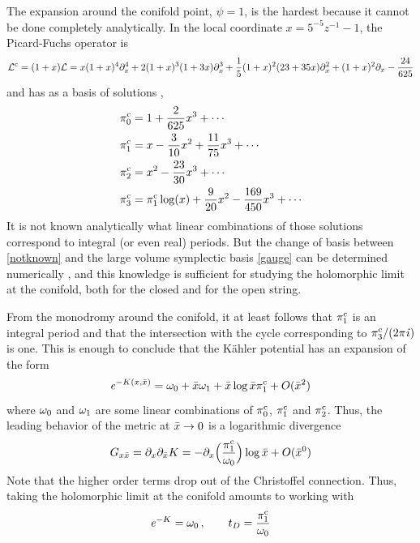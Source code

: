 The expansion around the conifold point, $\psi=1$, is the hardest because it 
cannot be done completely analytically. In the local coordinate
$x= 5^{-5}z^{-1} - 1$, the Picard-Fuchs operator is
\begin{equation}
{\cal L}^{\rm c} = (1+x){\cal L} = x(1+x)^4\partial_x^4 + 2(1+x)^3(1+3x)\partial_x^3+
\frac 15 (1+x)^2(23+35 x)\partial_x^2 + (1+x)^2\partial_x -\frac{24}{625}
\end{equation}
and has as a basis of solutions \cite{hkq},
\begin{equation}
\eqlabel{notknown}
\begin{split} 
\pic_0 &= 1 + \frac {2} {625} x^3 + \cdots \\
\pic_1 &= x - \frac {3} {10} x^2 + \frac {11} {75}x^3 + \cdots \\
\pic_2 &= x^2 - \frac {23} {30} x^3 + \cdots \\
\pic_3 &= \pic_1 \log(x) +\frac {9} {20} x^2 - \frac {169} {450} x^3 + \cdots
\end{split}
\end{equation}
It is not known analytically what linear combinations of those solutions
correspond to integral (or even real) periods. But the change of basis
between \eqref{notknown} and the large volume symplectic basis 
\eqref{gauge} can be determined numerically \cite{hkq}, and this
knowledge is sufficient for studying the holomorphic limit at the conifold,
both for the closed and for the open string.

From the monodromy around the conifold, it at least follows that
$\pi^{\rm c}_1$ is an integral period and that the intersection with the cycle
corresponding to $\pi^{\rm c}_3/(2\pi{\it i})$ is one. This is enough to conclude that 
the K\"ahler potential has an expansion of the form
\begin{equation}
{\it e}^{-K(x,{\bar x})} = \omega_0 + {\bar x} \omega_1 +{\bar x}\log {\bar x} \pi^{\rm c}_1 + O({\bar x}^2)
\end{equation}
where $\omega_0$ and $\omega_1$ are some linear combinations of
$\pi^{\rm c}_0$, $\pi^{\rm c}_1$ and $\pi^{\rm c}_2$. Thus, the leading behavior of
the metric at ${\bar x}\to 0$ is a logarithmic divergence
\begin{equation}
G_{x{\bar x}} =\partial_x\partial_{\bar x} K = -\partial_x\Bigl(\frac{\pi^{\rm c}_1}{\omega_0}\Bigr)\log {\bar x} + O({\bar x}^0)
\end{equation}
Note that the higher order terms drop out of the Christoffel connection.
Thus, taking the holomorphic limit at the conifold amounts to working 
with
\begin{equation}
{\it e}^{-K} = \omega_0 \,,\qquad t_D = \frac{\pi^{\rm c}_1}{\omega_0}
\end{equation}

